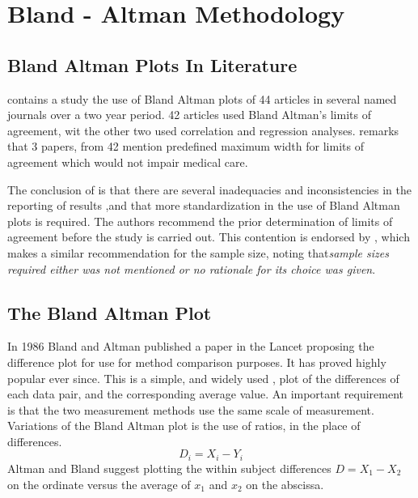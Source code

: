 \documentclass[12pt, a4paper]{report}
\begin{document}
\tableofcontents \setcounter{tocdepth}{2}

\newpage
\chapter{Bland - Altman Methodology}
\section{Bland Altman Plots In Literature}
\citet{mantha} contains a study the use of Bland Altman plots of 44 articles in several named journals over a two year period. 42
articles used Bland Altman's limits of agreement, wit the other two used correlation and regression analyses. \citet{mantha}
remarks that 3 papers, from 42 mention predefined maximum width for limits of agreement which would not impair medical care.

The conclusion of \citet{mantha} is that there are several inadequacies and inconsistencies in the reporting of results ,and
that more standardization in the use of Bland Altman plots is required. The authors recommend the prior determination of limits
of agreement before the study is carried out. This contention is endorsed by \citet{lin}, which makes a similar recommendation for
the sample size, noting that\emph{sample sizes required either was not mentioned or no rationale for its choice was given}.
\section{The Bland Altman Plot}

In 1986 Bland and Altman published a paper in the Lancet proposing the difference plot for use for method comparison purposes. It has
proved highly popular ever since. This is a simple, and widely used , plot of the differences of each data pair, and the
corresponding average value. An important requirement is that the two measurement methods use the same scale of measurement.
\\
Variations of the Bland Altman plot is the use of ratios, in the place of differences.
\begin{equation}
D_{i} = X_{i} - Y_{i}   \label{BA01}
\end{equation}
Altman and Bland suggest plotting the within subject differences $ D = X_{1} - X_{2} $ on the ordinate versus the average of $x_{1}$
and  $x_{2}$ on the abscissa. 
\end{document}
